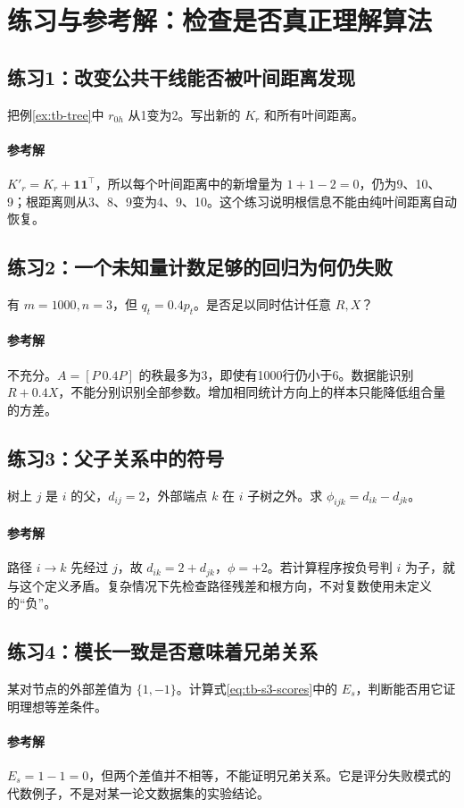 \documentclass[UTF8,11pt,fontset=fandol,openany,oneside]{ctexbook}
\theoremstyle{definition}
\theoremstyle{remark}
\numberwithin{equation}{chapter}
\begin{document}
\section{练习与参考解：检查是否真正理解算法}
\subsection{练习1：改变公共干线能否被叶间距离发现}
把例\ref{ex:tb-tree}中 $r_{0h}$ 从1变为2。写出新的 $K_r$ 和所有叶间距离。
\paragraph{参考解} $K'_r=K_r+\mathbf1\mathbf1^\top$，所以每个叶间距离中的新增量为 $1+1-2=0$，仍为9、10、9；根距离则从3、8、9变为4、9、10。这个练习说明根信息不能由纯叶间距离自动恢复。

\subsection{练习2：一个未知量计数足够的回归为何仍失败}
有 $m=1000,n=3$，但 $q_t=0.4p_t$。是否足以同时估计任意 $R,X$？
\paragraph{参考解}不充分。$A=[P\ 0.4P]$ 的秩最多为3，即使有1000行仍小于6。数据能识别 $R+0.4X$，不能分别识别全部参数。增加相同统计方向上的样本只能降低组合量的方差。

\subsection{练习3：父子关系中的符号}
树上 $j$ 是 $i$ 的父，$d_{ij}=2$，外部端点 $k$ 在 $i$ 子树之外。求 $\phi_{ijk}=d_{ik}-d_{jk}$。
\paragraph{参考解}路径 $i\to k$ 先经过 $j$，故 $d_{ik}=2+d_{jk}$，$\phi=+2$。若计算程序按负号判 $i$ 为子，就与这个定义矛盾。复杂情况下先检查路径残差和根方向，不对复数使用未定义的“负”。

\subsection{练习4：模长一致是否意味着兄弟关系}
某对节点的外部差值为 $\{1,-1\}$。计算式\eqref{eq:tb-s3-scores}中的 $E_s$，判断能否用它证明理想等差条件。
\paragraph{参考解} $E_s=1-1=0$，但两个差值并不相等，不能证明兄弟关系。它是评分失败模式的代数例子，不是对某一论文数据集的实验结论。
\end{document}
